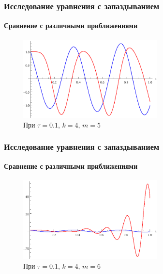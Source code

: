 \documentclass{beamer}
\numberwithin{equation}{section}
\begin{document}
    \begin{frame}
        \frametitle{Исследование уравнения с запаздыванием}
        \framesubtitle{Сравнение с различными приближениями}

        \begin{figure}[h]
        \begin{center}
            \includegraphics[width=0.65\textwidth]{example_better.eps}
        \end{center}
        \caption{При $\tau=0.1$, $k=4$, $m=5$}
        \end{figure}
    \end{frame}

    \begin{frame}
        \frametitle{Исследование уравнения с запаздыванием}
        \framesubtitle{Сравнение с различными приближениями}

        \begin{figure}[h]
        \begin{center}
            \includegraphics[width=0.65\textwidth]{example_boom.eps}
        \end{center}
        \caption{При $\tau=0.1$, $k=4$, $m=6$}
        \end{figure}
    \end{frame}
\end{document}
